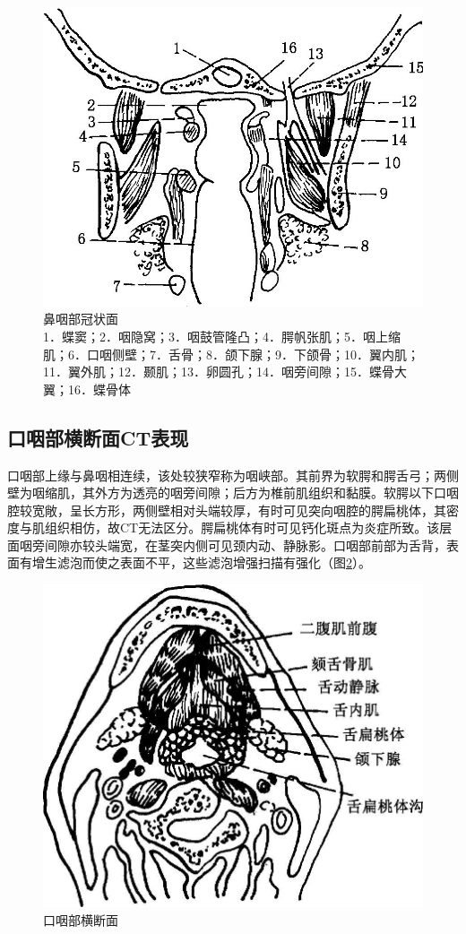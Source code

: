 \begin{figure}[!htbp]
 \centering
 \includegraphics[width=.7\textwidth,height=\textheight,keepaspectratio]{./images/Image00135.jpg}
 \captionsetup{justification=centering}
 \caption{鼻咽部冠状面\\{\small 1．蝶窦；2．咽隐窝；3．咽鼓管隆凸；4．腭帆张肌；5．咽上缩肌；6．口咽侧壁；7．舌骨；8．颌下腺；9．下颌骨；10．翼内肌；11．翼外肌；12．颞肌；13．卵圆孔；14．咽旁间隙；15．蝶骨大翼；16．蝶骨体}}
 \label{fig6-2}
  \end{figure} 

\subsection{口咽部横断面CT表现}

口咽部上缘与鼻咽相连续，该处较狭窄称为咽峡部。其前界为软腭和腭舌弓；两侧壁为咽缩肌，其外方为透亮的咽旁间隙；后方为椎前肌组织和黏膜。软腭以下口咽腔较宽敞，呈长方形，两侧壁相对头端较厚，有时可见突向咽腔的腭扁桃体，其密度与肌组织相仿，故CT无法区分。腭扁桃体有时可见钙化斑点为炎症所致。该层面咽旁间隙亦较头端宽，在茎突内侧可见颈内动、静脉影。口咽部前部为舌背，表面有增生滤泡而使之表面不平，这些滤泡增强扫描有强化（图\ref{fig6-3}）。

\begin{figure}[!htbp]
 \centering
 \includegraphics[width=.7\textwidth,height=\textheight,keepaspectratio]{./images/Image00136.jpg}
 \captionsetup{justification=centering}
 \caption{口咽部横断面}
 \label{fig6-3}
  \end{figure} 

